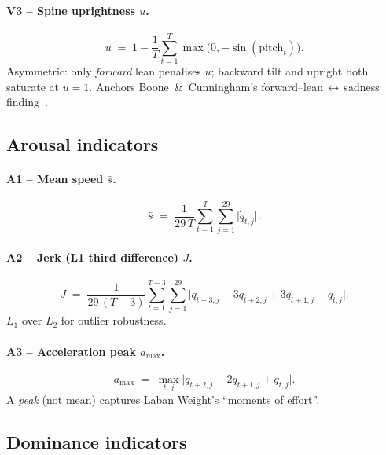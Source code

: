 \paragraph{V3 -- Spine uprightness $u$.}
\begin{equation}
  u \;=\; 1 - \frac{1}{T}\sum_{t=1}^{T}\max\!\bigl(0,-\sin(\text{pitch}_t)\bigr).
  \label{eq:u}
\end{equation}
Asymmetric: only \emph{forward} lean penalises $u$; backward tilt and
upright both saturate at $u=1$. Anchors Boone~\&~Cunningham's
forward--lean$\,\leftrightarrow\,$sadness finding~\cite{boone2001children}.

\subsection{Arousal indicators}

\paragraph{A1 -- Mean speed $\bar s$.}
\begin{equation}
  \bar s \;=\; \frac{1}{29\,T}\sum_{t=1}^{T}\sum_{j=1}^{29}\bigl|\dot q_{t,j}\bigr|.
  \label{eq:speed}
\end{equation}

\paragraph{A2 -- Jerk (L1 third difference) $J$.}
\begin{equation}
  J \;=\; \frac{1}{29\,(T-3)}\sum_{t=1}^{T-3}\sum_{j=1}^{29}\bigl|q_{t+3,j}-3q_{t+2,j}+3q_{t+1,j}-q_{t,j}\bigr|.
  \label{eq:jerk}
\end{equation}
$L_1$ over $L_2$ for outlier robustness.

\paragraph{A3 -- Acceleration peak $a_{\max}$.}
\begin{equation}
  a_{\max} \;=\; \max_{t,\,j}\bigl|q_{t+2,j}-2q_{t+1,j}+q_{t,j}\bigr|.
  \label{eq:accmax}
\end{equation}
A \emph{peak} (not mean) captures Laban Weight's ``moments of effort''.

\subsection{Dominance indicators}

